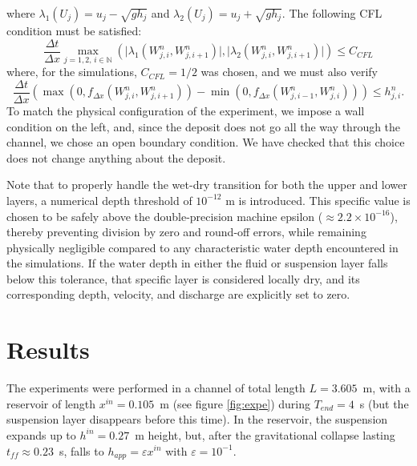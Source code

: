 where $\lambda_1(U_j) = u_j-\sqrt{gh_j}$ and $\lambda_2(U_j) = u_j+\sqrt{gh_j}$.
The following CFL condition must be satisfied:
\begin{equation*}
    \frac{\Delta t }{\Delta x} \max_{j=1,2, \, i\in\mathbb{N}} (\vert \lambda_1(W_{j,i}^n,W_{j,i+1}^n)\vert, \vert \lambda_2(W_{j,i}^n,W_{j,i+1}^n)\vert )
    \leq C_{CFL}
\end{equation*}
where, for the simulations, $C_{CFL} = 1/2$ was chosen, and we must also verify
\begin{equation*}
    \frac{\Delta t }{\Delta x}  \left( \max(0,f_{\Delta x}(W_{j,i}^n,W_{j,i+1}^n)) - \min (0,f_{\Delta x}(W_{j,i-1}^n,W_{j,i}^n))
    \right) \leq h_{j,i}^n.
\end{equation*}
To match the physical configuration of the experiment, we impose a wall condition on the left, and, since the deposit does not go all the way through the channel, we chose an open boundary condition. We have checked that this choice does not change anything about the deposit.

Note that to properly handle the wet-dry transition for both the upper and lower layers, a numerical depth threshold of $10^{-12}$ m is introduced. This specific value is chosen to be safely above the double-precision machine epsilon ($\approx 2.2 \times 10^{-16}$), thereby preventing division by zero and round-off errors, while remaining physically negligible compared to any characteristic water depth encountered in the simulations. If the water depth in either the fluid or suspension layer falls below this tolerance, that specific layer is considered locally dry, and its corresponding depth, velocity, and discharge are explicitly set to zero.

\section{Results}
The experiments were performed in a channel of total length $L=3.605$~m, with a reservoir of length $x^{in}=0.105$~m (see figure \ref{fig:expe}) during $T_{end}=4$~s (but the suspension layer disappears before this time). In the reservoir, the suspension expands up to $h^{in}=0.27$~m height, but, after the gravitational collapse lasting $t_{f\!f}\approx 0.23$~s, falls to
$h_{app}=\varepsilon x^{in}$ with $\varepsilon=10^{-1}$.

